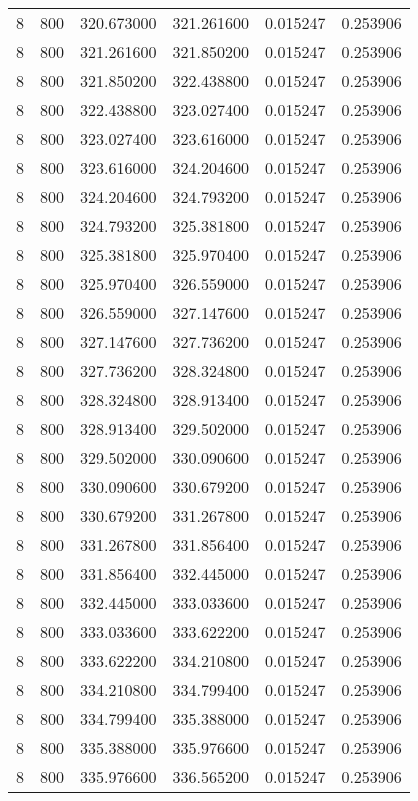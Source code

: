 \begin{longtable}{rrrrrr}
8 & 800 & 320.673000 & 321.261600 & 0.015247 & 0.253906 \\
8 & 800 & 321.261600 & 321.850200 & 0.015247 & 0.253906 \\
8 & 800 & 321.850200 & 322.438800 & 0.015247 & 0.253906 \\
8 & 800 & 322.438800 & 323.027400 & 0.015247 & 0.253906 \\
8 & 800 & 323.027400 & 323.616000 & 0.015247 & 0.253906 \\
8 & 800 & 323.616000 & 324.204600 & 0.015247 & 0.253906 \\
8 & 800 & 324.204600 & 324.793200 & 0.015247 & 0.253906 \\
8 & 800 & 324.793200 & 325.381800 & 0.015247 & 0.253906 \\
8 & 800 & 325.381800 & 325.970400 & 0.015247 & 0.253906 \\
8 & 800 & 325.970400 & 326.559000 & 0.015247 & 0.253906 \\
8 & 800 & 326.559000 & 327.147600 & 0.015247 & 0.253906 \\
8 & 800 & 327.147600 & 327.736200 & 0.015247 & 0.253906 \\
8 & 800 & 327.736200 & 328.324800 & 0.015247 & 0.253906 \\
8 & 800 & 328.324800 & 328.913400 & 0.015247 & 0.253906 \\
8 & 800 & 328.913400 & 329.502000 & 0.015247 & 0.253906 \\
8 & 800 & 329.502000 & 330.090600 & 0.015247 & 0.253906 \\
8 & 800 & 330.090600 & 330.679200 & 0.015247 & 0.253906 \\
8 & 800 & 330.679200 & 331.267800 & 0.015247 & 0.253906 \\
8 & 800 & 331.267800 & 331.856400 & 0.015247 & 0.253906 \\
8 & 800 & 331.856400 & 332.445000 & 0.015247 & 0.253906 \\
8 & 800 & 332.445000 & 333.033600 & 0.015247 & 0.253906 \\
8 & 800 & 333.033600 & 333.622200 & 0.015247 & 0.253906 \\
8 & 800 & 333.622200 & 334.210800 & 0.015247 & 0.253906 \\
8 & 800 & 334.210800 & 334.799400 & 0.015247 & 0.253906 \\
8 & 800 & 334.799400 & 335.388000 & 0.015247 & 0.253906 \\
8 & 800 & 335.388000 & 335.976600 & 0.015247 & 0.253906 \\
8 & 800 & 335.976600 & 336.565200 & 0.015247 & 0.253906 \\

\end{longtable}
